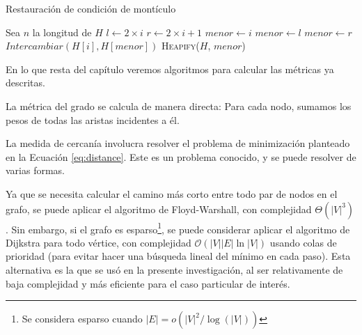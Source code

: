 \documentclass[journal]{IEEEtran}
\let\MYoriglatexcaption\caption
\renewcommand{\caption}[2][\relax]{\MYoriglatexcaption[#2]{#2}}
\begin{document}
\begin{algorithm}[H]
	\caption{Restauración de condición de montículo} \label{alg:heapify}
	\begin{algorithmic}
		\State Sea $n$ la longitud de $H$
		\State $l \gets 2\times i$
		\State $r \gets 2\times i + 1$
		\State $menor \gets i$ 
		\State $menor \gets l$
		\EndIf
		\State $menor \gets r$
		\EndIf
		 
		\State $Intercambiar(H[i], H[menor])$
		\State \textsc{Heapify}($H$, $menor$)
		\EndIf
		\EndFunction
	\end{algorithmic}
\end{algorithm}

En lo que resta del capítulo veremos algoritmos para calcular las métricas ya descritas.

La métrica del grado se calcula de manera directa: Para cada nodo, sumamos los pesos de todas las aristas incidentes a él.

La medida de cercanía involucra resolver el problema de minimización planteado en la Ecuación \ref{eq:distance}. Este es un problema conocido, y se puede resolver de varias formas.

Ya que se necesita calcular el camino más corto entre todo par de nodos en el grafo, se puede aplicar el algoritmo de Floyd-Warshall, con complejidad \(\Theta(|V|^3)\) \cite{clrs}. Sin embargo, si el grafo es esparso\footnote{Se considera esparso cuando \(|E| = o(|V|^2 / \log(|V|))\)\cite{clrs}}, se puede considerar aplicar el algoritmo de Dijkstra para todo vértice, con complejidad \(\mathcal{O}(|V||E|\ln |V|)\) usando colas de prioridad (para evitar hacer una búsqueda lineal del mínimo en cada paso). Esta alternativa es la que se usó en la presente investigación, al ser relativamente de baja complejidad y más eficiente para el caso particular de interés.
\end{document}
